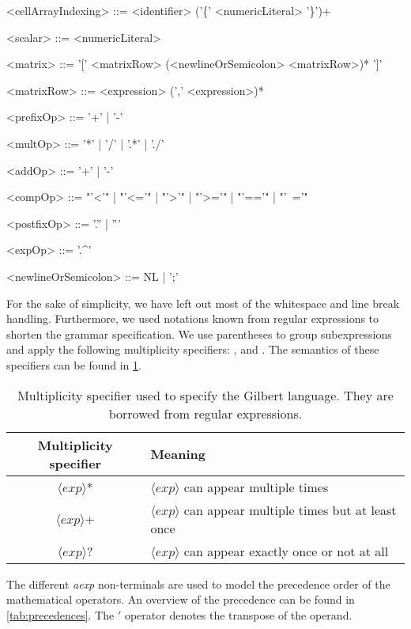 \begin{grammar}
<cellArrayIndexing> ::= <identifier> ('\{' <numericLiteral> '\}')+

<scalar> ::= <numericLiteral>

<matrix> ::= '[' <matrixRow> (<newlineOrSemicolon> <matrixRow>)* ']'

<matrixRow> ::= <expression> (',' <expression>)*

<prefixOp> ::= '+' | '-'

<multOp> ::= '*' | '/' | '.*' | './'

<addOp> ::= '+' | '-'

<compOp> ::= "'<'" | "'<='" | "'>'" | "'>='" | "'=='" | "'~='"

<postfixOp> ::= '.'' | '''

<expOp> ::= '.\textasciicircum'

<newlineOrSemicolon> ::= NL | ';'

\end{grammar}

For the sake of simplicity, we have left out most of the whitespace and line break handling.
Furthermore, we used notations known from regular expressions to shorten the grammar specification.
We use parentheses to group subexpressions and apply the following multiplicity specifiers: \code{*}, \code{+} and .
The semantics of these specifiers can be found in \cref{tab:multiplicity}.

\begin{table}[!h]
	\centering
	\begin{tabular}{c|l}
	Multiplicity specifier & Meaning\\
	\hline
	$\langle exp \rangle$* & $\langle exp\rangle$ can appear multiple times \\
	$\langle exp\rangle$+ & $\langle exp\rangle$ can appear multiple times but at least once \\
	$\langle exp\rangle$? & $\langle exp\rangle$ can appear exactly once or not at all
	\end{tabular}
	\caption{Multiplicity specifier used to specify the Gilbert language. They are borrowed from regular expressions.}
	\label{tab:multiplicity}
\end{table}

The different \emph{aexp} non-terminals are used to model the precedence order of the mathematical operators.
An overview of the precedence can be found in \cref{tab:precedences}.
The $'$ operator denotes the transpose of the operand.

